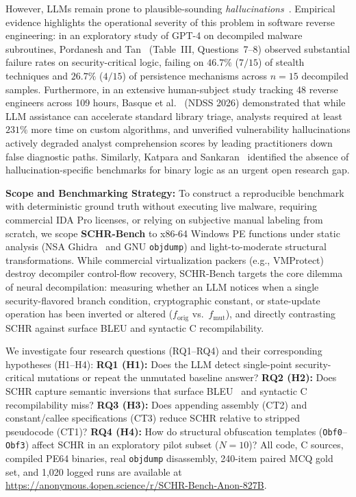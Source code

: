 \documentclass[conference]{IEEEtran}
\begin{document}
However, LLMs remain prone to plausible-sounding \textit{hallucinations}~\cite{ji2023hallucination,min2023factscore}. Empirical evidence highlights the operational severity of this problem in software reverse engineering: in an exploratory study of GPT-4 on decompiled malware subroutines, Pordanesh and Tan~\cite{pordanesh2024exploring} (Table~III, Questions~7--8) observed substantial failure rates on security-critical logic, failing on $46.7\%$ ($7/15$) of stealth techniques and $26.7\%$ ($4/15$) of persistence mechanisms across $n=15$ decompiled samples. Furthermore, in an extensive human-subject study tracking 48 reverse engineers across 109 hours, Basque et al.~\cite{basque2026decompiling} (NDSS 2026) demonstrated that while LLM assistance can accelerate standard library triage, analysts required at least $231\%$ more time on custom algorithms, and unverified vulnerability hallucinations actively degraded analyst comprehension scores by leading practitioners down false diagnostic paths. Similarly, Katpara and Sankaran~\cite{katpara2026firmware} identified the absence of hallucination-specific benchmarks for binary logic as an urgent open research gap.

\textbf{Scope and Benchmarking Strategy:} To construct a reproducible benchmark with deterministic ground truth without executing live malware, requiring commercial IDA Pro licenses, or relying on subjective manual labeling from scratch, we scope \textbf{SCHR-Bench} to x86-64 Windows PE functions under static analysis (NSA Ghidra~\cite{ghidra2024nsa} and GNU \texttt{objdump}) and light-to-moderate structural transformations. While commercial virtualization packers (e.g., VMProtect) destroy decompiler control-flow recovery, SCHR-Bench targets the core dilemma of neural decompilation: measuring whether an LLM notices when a single security-flavored branch condition, cryptographic constant, or state-update operation has been inverted or altered ($f_{\text{orig}}$ vs.\ $f_{\text{mut}}$), and directly contrasting SCHR against surface BLEU and syntactic C recompilability.

We investigate four research questions (RQ1--RQ4) and their corresponding hypotheses (H1--H4): \textbf{RQ1 (H1):} Does the LLM detect single-point security-critical mutations or repeat the unmutated baseline answer? \textbf{RQ2 (H2):} Does SCHR capture semantic inversions that surface BLEU~\cite{papineni2002bleu} and syntactic C recompilability miss? \textbf{RQ3 (H3):} Does appending assembly (CT2) and constant/callee specifications (CT3) reduce SCHR relative to stripped pseudocode (CT1)? \textbf{RQ4 (H4):} How do structural obfuscation templates (\texttt{Obf0}--\texttt{Obf3}) affect SCHR in an exploratory pilot subset ($N=10$)? All code, C sources, compiled PE64 binaries, real \texttt{objdump} disassembly, 240-item paired MCQ gold set, and 1,020 logged runs are available at \url{https://anonymous.4open.science/r/SCHR-Bench-Anon-827B}.
\end{document}
